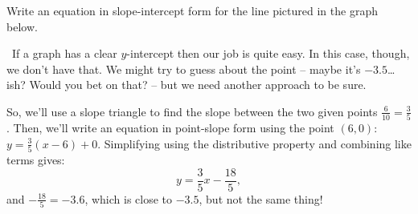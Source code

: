 \begin{boxedex}
Write an equation in slope-intercept form for the line pictured in the graph below.

\begin{center}
\end{center}
%

\exsoln\ If a graph has a clear $y$-intercept then our job is quite easy. In this case, though, we don't have that. We might try to guess about the point -- maybe it's $-3.5$\ldots ish? Would you bet on that? -- but we need another approach to be sure.

So, we'll use a slope triangle to find the slope between the two given points $\frac{6}{10} = \frac{3}{5}$. Then, we'll write an equation in point-slope form using the point $(6,0)$: $y=\frac{3}{5}(x-6)+0$. Simplifying using the distributive property and combining like terms gives: \[y=\frac{3}{5}x - \frac{18}{5},\] and $-\frac{18}{5} = -3.6$, which is close to $-3.5$, but not the same thing!
\end{boxedex}

